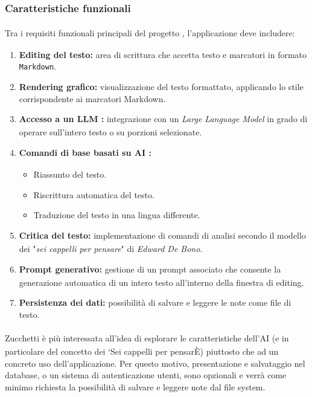 \documentclass[a4paper,11pt]{article}
\begin{document}
\subsubsection{Caratteristiche funzionali\textsubscript{}
}
Tra i requisiti\textsubscript{}
 funzionali\textsubscript{}
 principali del progetto\textsubscript{}
, l'applicazione deve includere:
\begin{enumerate}[noitemsep, topsep=0pt]
 \item \textbf{Editing del testo:} area di scrittura che accetta testo e marcatori in formato \texttt{Markdown}.
 \item \textbf{Rendering grafico:} visualizzazione del testo formattato, applicando lo stile corrispondente ai marcatori Markdown.
 \item \textbf{Accesso a un LLM\textsubscript{}
:} integrazione con un \textit{Large Language Model\textsubscript{}
} in grado di operare sull'intero testo o su porzioni selezionate.
 \item \textbf{Comandi di base basati su AI\textsubscript{}
:}
 \begin{itemize}
  \item Riassunto del testo.
  \item Riscrittura automatica del testo.
  \item Traduzione del testo in una lingua differente.
 \end{itemize}
 
 \item \textbf{Critica del testo:} implementazione\textsubscript{} di comandi di analisi secondo il modello dei "\textit{sei cappelli per pensare}" di \textit{Edward De Bono}.
 \item \textbf{Prompt\textsubscript{}
 generativo:} gestione di un prompt\textsubscript{}
 associato che consente la generazione automatica di un intero testo all'interno della finestra di editing.
 \item \textbf{Persistenza dei dati:} possibilità di salvare e leggere le note come file di testo.
\end{enumerate}
\paragraph{}
Zucchetti è più interessata all'idea di esplorare le caratteristiche dell'AI\textsubscript{}
 (e in particolare del concetto dei `Sei cappelli per pensarÈ) piuttosto che ad un concreto uso dell'applicazione. Per questo motivo,
presentazione e salvataggio nel database, o un sistema di autenticazione utenti, sono opzionali e verrà come minimo richiesta la possibilità di salvare e leggere note dal file system.
\end{document}

